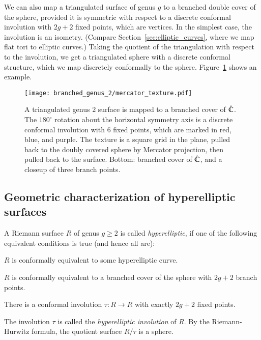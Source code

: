 \documentclass[Thesis]{subfiles}
\begin{document}
 We
can also map a triangulated surface of genus $g$ to a branched double
cover of the sphere, provided it is symmetric with respect to a
discrete conformal involution with $2g+2$ fixed points, which are
vertices. In the simplest case, the involution is an
isometry. (Compare Section~\ref{sec:elliptic_curves}, where we map
flat tori to elliptic curves.) Taking the quotient of the triangulation
with respect to the involution, we get a triangulated sphere with a
discrete conformal structure, which we map discretely conformally to
the sphere.  Figure~\ref{fig:genus2_branched} shows an example.
\begin{figure} 
\centering
\texttt{[image: branched\_genus\_2/mercator\_texture.pdf]}\\
\caption{A triangulated genus $2$ surface is mapped to a branched
  cover of $\hat{\mathbb C}$. The $180^{\circ}$ rotation about the horizontal
  symmetry axis is a discrete conformal involution with $6$ fixed
  points, which are marked in red, blue, and purple. The texture is a
  square grid in the plane, pulled back to the doubly covered sphere
  by Mercator projection, then pulled back to the surface. Bottom:
  branched cover of $\hat{\mathbb C}$, and a closeup of three branch points.}
\label{fig:genus2_branched} 
\end{figure}

\subsection{Geometric characterization of hyperelliptic surfaces}
\label{sec:hyperelliptic_domain}

A Riemann surface $R$ of genus $g\geq 2$ is called \emph{hyperelliptic},
if one of the following equivalent conditions is true (and hence all are):
\begin{compactenum}[(i)]
\item $R$ is conformally equivalent to some hyperelliptic curve.
\item $R$ is conformally equivalent to a branched cover of the sphere
  with $2g+2$ branch points.
\item There is a conformal involution $\tau:R\rightarrow R$ with
  exactly $2g+2$ fixed points. 
\end{compactenum}
The involution $\tau$ is called the \emph{hyperelliptic involution} of
$R$. By the Riemann-Hurwitz formula, the quotient surface $R/\tau$ is a
sphere. 
\end{document}
